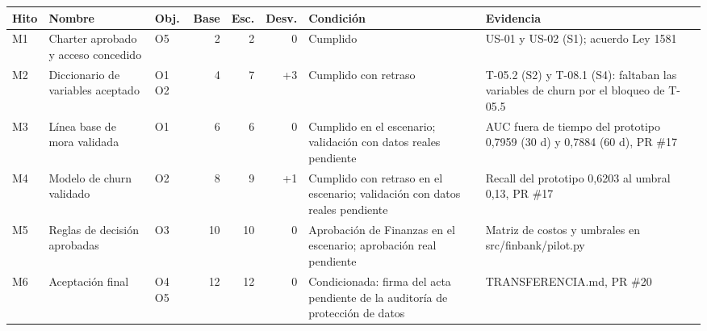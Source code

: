 \scriptsize
\begin{tabularx}{\linewidth}{l p{2.6cm} l r r r X X}
\toprule
\textbf{Hito} & \textbf{Nombre} & \textbf{Obj.} & \textbf{Base} & \textbf{Esc.} & \textbf{Desv.} & \textbf{Condición} & \textbf{Evidencia} \\
\midrule
M1 & Charter aprobado y acceso concedido & O5 & 2 & 2 & 0 & Cumplido & US-01 y US-02 (S1); acuerdo Ley 1581 \\
M2 & Diccionario de variables aceptado & O1 O2 & 4 & 7 & +3 & Cumplido con retraso & T-05.2 (S2) y T-08.1 (S4): faltaban las variables de churn por el bloqueo de T-05.5 \\
M3 & Línea base de mora validada & O1 & 6 & 6 & 0 & Cumplido en el escenario; validación con datos reales pendiente & AUC fuera de tiempo del prototipo 0,7959 (30 d) y 0,7884 (60 d), PR \#17 \\
M4 & Modelo de churn validado & O2 & 8 & 9 & +1 & Cumplido con retraso en el escenario; validación con datos reales pendiente & Recall del prototipo 0,6203 al umbral 0,13, PR \#17 \\
M5 & Reglas de decisión aprobadas & O3 & 10 & 10 & 0 & Aprobación de Finanzas en el escenario; aprobación real pendiente & Matriz de costos y umbrales en src/finbank/pilot.py \\
M6 & Aceptación final & O4 O5 & 12 & 12 & 0 & Condicionada: firma del acta pendiente de la auditoría de protección de datos & TRANSFERENCIA.md, PR \#20 \\
\bottomrule
\end{tabularx}
